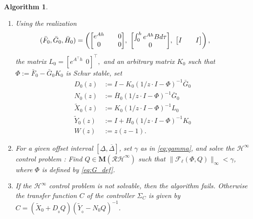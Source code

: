 \documentclass[letterpaper, 12pt, draftcls, onecolumn]{ieeeconf}
\newtheorem{algorithm}[theorem]{Algorithm}
\begin{document}
\begin{algorithm}
	\label{alg:controller_design}
	\begin{enumerate}
		\item
		Using the realization 
		\[
		\hspace{-22pt}(\bar F_0, \bar G_0, \bar H_0) = 
		\left(
		\begin{bmatrix}
		e^{Ah} &\quad 0 \\
		0 & \quad 0
		\end{bmatrix}\!,~
		\begin{bmatrix}
		\int^h_0e^{Ah}Bd\tau  \\
		0 
		\end{bmatrix}\!,~
		\begin{bmatrix}
		I &\quad I
		\end{bmatrix}
		\right),
		\]
		the matrix 
$			L_0 = 
		[
		e^{A^{\top}h} ~~ 0
		]^{\top},
		$		
and an arbitrary matrix $K_0$ such that $\Phi := \bar F_0 - \bar G_0 K_0$ is Schur stable,
		set
		\begin{align*}
		D_{0}(z) &:=
		I - K_0(1/z\cdot I -\Phi )^{-1} \bar G_{0} \\
		N_{0}(z) &:=
		\bar H_0(1/z\cdot I - \Phi )^{-1} \bar G_{0} \\
		\tilde X_{0}(z) &:= K_{0}
		(1/z\cdot I - \Phi )^{-1}  L_{0} \\
		\tilde Y_{0}(z) &:= I + H_{0}
		(1/z\cdot I - \Phi )^{-1} K_{0} \\
		W(z) &:= z(z-1).
		\end{align*}
		
		\item 
		For a given offset interval $[\underline \Delta, \overline \Delta]$,
		set $\gamma$ as in \eqref{eq:gamma}, and
		solve the $\mathcal{H}^{\infty}$ control problem \cite[Chaps.~16,~17]{zhou1996}:
		Find $Q \in \mathbf{M}(\mathcal{RH}^{\infty})$ such that 
		$\|\mathcal{F}_{\ell}(\Phi,Q)\|_{\infty} < \gamma$,
		where $\Phi$ is defined by \eqref{eq:G_def}.
		
		
		\item 
		If the $\mathcal{H}^{\infty}$ control problem is not solvable,
		then the algorithm fails.
		Otherwise the transfer function $C$ of the 
		controller $\Sigma_C$
		is given by $C = (\tilde X_{0} + 
		D_{_0} Q)
		(\tilde Y_{_0} - N_{0}Q )^{-1}$.
	\end{enumerate}
\end{algorithm}
\end{document}
